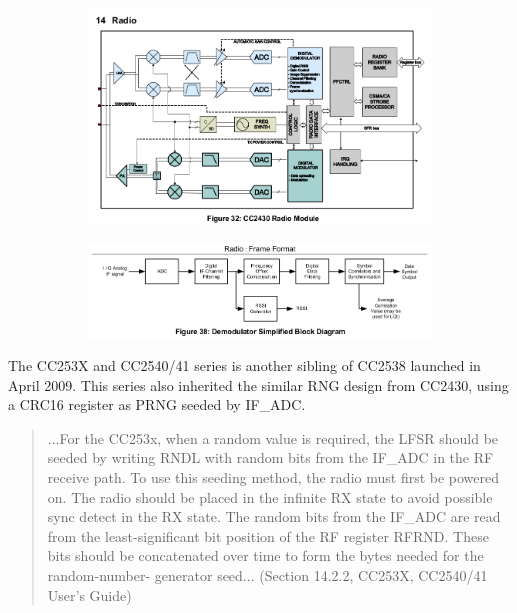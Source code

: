 \begin{figure}
\center
\caption{Radio and Demodulator of CC2430 from CC2430 User's Guide}
\begin{subfigure}{\linewidth}
	\includegraphics[width=\linewidth]{./figures/CC2430_Radio.png}
\end{subfigure}

\begin{subfigure}{\linewidth}
	\includegraphics[width=\linewidth]{./figures/CC2430_Demodulator.png}
\end{subfigure}
\label{CC2430_RF}
\end{figure}

The CC253X and CC2540/41 series\cite{CC253X_Manual} is another sibling of CC2538 launched in April 2009. This series also inherited the similar RNG design from CC2430, using a CRC16 register as PRNG seeded by IF\_ADC.

\begin{quote}
...For the CC253x, when a random value is required, the LFSR should be seeded by writing RNDL with random bits from the IF\_ADC in the RF receive path. To use this seeding method, the radio must first be powered on. The radio should be placed in the infinite RX state to avoid possible sync detect in the RX state. The random bits from the IF\_ADC are read from the least-significant bit position of the RF register RFRND. These bits should be concatenated over time to form the bytes needed for the random-number-
generator seed... (Section 14.2.2, CC253X, CC2540/41 User's Guide)
\end{quote}

